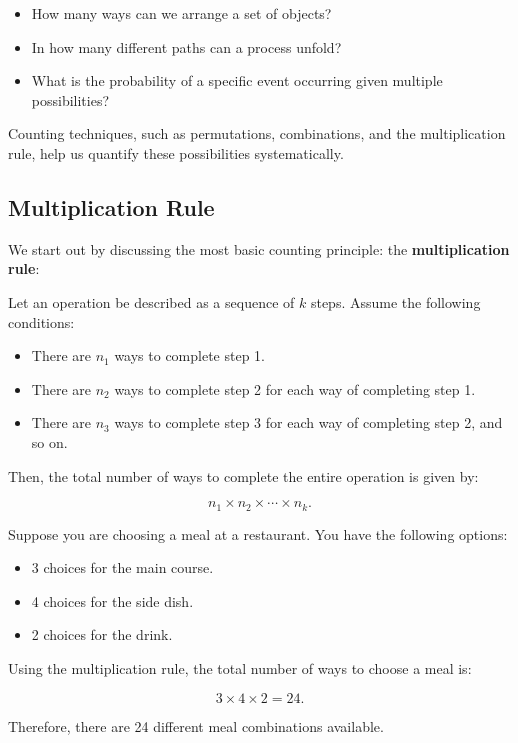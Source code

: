 \begin{itemize}
    \item How many ways can we arrange a set of objects?
    \item In how many different paths can a process unfold?
    \item What is the probability of a specific event occurring given multiple possibilities?
\end{itemize}

Counting techniques, such as permutations, combinations, and the multiplication rule, help us quantify these possibilities systematically.

\subsection*{Multiplication Rule}

We start out by discussing the most basic counting principle: the \textbf{multiplication rule}:

\begin{theorem}
    Let an operation be described as a sequence of $k$ steps. Assume the following conditions:
    
    \begin{itemize}
        \item There are $n_1$ ways to complete step 1.
        \item There are $n_2$ ways to complete step 2 for each way of completing step 1.
        \item There are $n_3$ ways to complete step 3 for each way of completing step 2, and so on.
    \end{itemize}
    
    Then, the total number of ways to complete the entire operation is given by:
    
    \[
    n_1 \times n_2 \times \cdots \times n_k.
    \]
\end{theorem}
    
\begin{example}
    Suppose you are choosing a meal at a restaurant. You have the following options:
        
    \begin{itemize}
            \item 3 choices for the main course.
            \item 4 choices for the side dish.
            \item 2 choices for the drink.
    \end{itemize}
        
    Using the multiplication rule, the total number of ways to choose a meal is:
        
    \[
        3 \times 4 \times 2 = 24.
    \]
        
    Therefore, there are 24 different meal combinations available.
\end{example}

